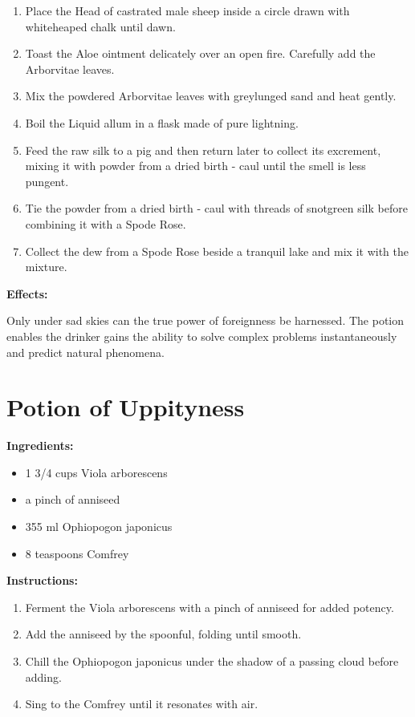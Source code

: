 \documentclass{article}
\begin{document}
\begin{enumerate}
  \item Place the Head of castrated male sheep inside a circle drawn with whiteheaped chalk until dawn.
  \item Toast the Aloe ointment delicately over an open fire. Carefully add the Arborvitae leaves.
  \item Mix the powdered Arborvitae leaves with greylunged sand and heat gently.
  \item Boil the Liquid allum in a flask made of pure lightning.
  \item Feed the raw silk to a pig and then return later to collect its excrement, mixing it with powder from a dried birth - caul until the smell is less pungent.
  \item Tie the powder from a dried birth - caul with threads of snotgreen silk before combining it with a Spode Rose.
  \item Collect the dew from a Spode Rose beside a tranquil lake and mix it with the mixture.
\end{enumerate}

\textbf{Effects:}

Only under sad skies can the true power of foreignness be harnessed. The potion enables the drinker gains the ability to solve complex problems instantaneously and predict natural phenomena.

\newpage
\section*{Potion of Uppityness}

\textbf{Ingredients:}

\begin{itemize}
  \item 1 3/4 cups Viola arborescens
  \item a pinch of anniseed
  \item 355 ml Ophiopogon japonicus
  \item 8 teaspoons Comfrey
\end{itemize}

\textbf{Instructions:}

\begin{enumerate}
  \item Ferment the Viola arborescens with a pinch of anniseed for added potency.
  \item Add the anniseed by the spoonful, folding until smooth.
  \item Chill the Ophiopogon japonicus under the shadow of a passing cloud before adding.
  \item Sing to the Comfrey until it resonates with air.
\end{enumerate}
\end{document}
